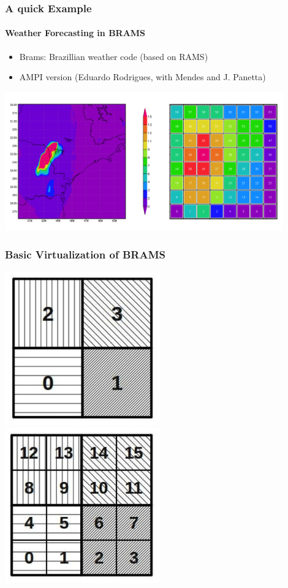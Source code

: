 {\begin{frame}[fragile]
\frametitle{A quick Example}
\framesubtitle{Weather Forecasting in BRAMS}
\begin{itemize}
 \item Brams: Brazillian weather code (based on RAMS)
 \item AMPI version (Eduardo Rodrigues, with Mendes and J. Panetta)
\end{itemize}
\includegraphics[width=0.9\textwidth]{figures/bramsVisual.png}
\end{frame}


\begin{frame}[fragile]
\frametitle{Basic Virtualization of BRAMS}
\includegraphics[width=0.5\textwidth]{figures/bramsNonVirtual.png}%
\includegraphics[width=0.5\textwidth]{figures/bramsVirtual.png}
\end{frame}

}
